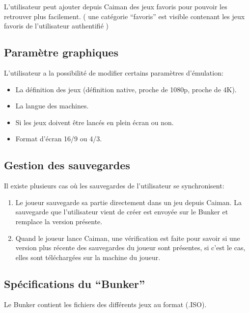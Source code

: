 \documentclass[a4paper,12pt,french]{sphinxmanual}
\begin{document}
\sphinxAtStartPar
L’utilisateur peut ajouter depuis Caiman des jeux favoris pour pouvoir les retrouver plus facilement. ( une catégorie “favoris” est visible contenant les jeux favoris de l’utilisateur authentifié )


\subsection{Paramètre graphiques}
\label{\detokenize{cdc:parametre-graphiques}}
\sphinxAtStartPar
L’utilisateur a la possibilité de modifier certains paramètres d’émulation:
\begin{itemize}
\item {} 
\sphinxAtStartPar
La définition des jeux (définition native, proche de 1080p, proche de 4K).

\item {} 
\sphinxAtStartPar
La langue des machines.

\item {} 
\sphinxAtStartPar
Si les jeux doivent être lancés en plein écran ou non.

\item {} 
\sphinxAtStartPar
Format d’écran 16/9 ou 4/3.

\end{itemize}


\subsection{Gestion des sauvegardes}
\label{\detokenize{cdc:gestion-des-sauvegardes}}
\sphinxAtStartPar
Il existe plusieurs cas où les sauvegardes de l’utilisateur se synchronisent:
\begin{enumerate}
%
\item {} 
\sphinxAtStartPar
Le joueur sauvegarde sa partie directement dans un jeu depuis Caiman. La sauvegarde que l’utilisateur vient de créer est envoyée sur le Bunker et remplace la version présente.

\item {} 
\sphinxAtStartPar
Quand le joueur lance Caiman, une vérification est faite pour savoir si une version plus récente des sauvegardes du joueur sont présentes, si c’est le cas, elles sont téléchargées sur la machine du joueur.

\end{enumerate}


\subsection{Spécifications du “Bunker”}
\label{\detokenize{cdc:specifications-du-bunker}}
\sphinxAtStartPar
Le Bunker contient les fichiers des différents jeux au format (.ISO).
\end{document}
